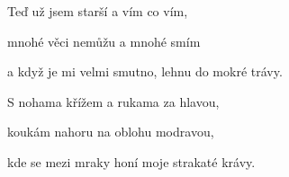 \begin{song}
\bigskip

\Refren

\bigskip

Teď už jsem starší a vím co vím, \par
{}mnohé věci nemůžu a mnohé smím \par
{}a když je mi velmi smutno, lehnu do mokré trávy. \par

\bigskip

S nohama křížem a rukama za hlavou, \par
{}koukám nahoru na oblohu modravou, \par
{}kde se mezi mraky honí moje strakaté krávy. \par

\bigskip

\Refren

\bigskip

\end{song}
